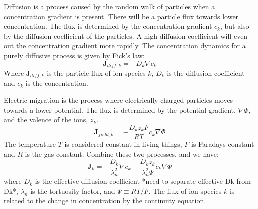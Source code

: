 \documentclass{article}
\begin{document}
Diffusion is a process caused by the random walk of particles when a concentration gradient is present. There will be a particle flux towards lower concentration. The flux is determined by the concentration gradient $c_k$, but also by the diffusion coefficient of the particles. A high diffusion coefficient will even out the concentration gradient more rapidly. The concentration dynamics for a purely diffusive process is given by Fick's law:
\begin{equation}\label{eq:diff}
 \bm{J}_{diff,k} = - D_k\nabla c_k
\end{equation}
Where  $\bm{J}_{diff,k}$ is the particle flux of ion species $k$, $D_k$ is the diffusion coefficient and $c_k$ is the concentration.

Electric migration is the process where electrically charged particles moves towards a lower potential. The flux is determined by the potential gradient, $\nabla \Phi$,  and the valence of the ions, $z_k$. 
\begin{equation}\label{eq:field}
\bm{J}_{field,k} = -\frac{D_kz_kF}{RT} c_k\nabla \Phi
\end{equation}
The temperature $T$ is considered constant in living things, $F$ is Faradays constant and $R$ is the gas constant. Combine these two processes, and we have:
 \begin{equation}\label{eq:eldiff fulx}
\bm{J}_k = -\frac{D_k}{\lambda_n^2}\nabla c_k -\frac{D_k z_k}{\lambda_n^2 \Psi}c_k  \nabla \Phi
\end{equation}
where $D_k$ is the effective diffusion coefficient *need to separate effective Dk from Dk*, $\lambda_n$ is the tortuosity factor, and $\Psi \equiv RT/F$.
The flux  of ion species $k$ is related to the change in concentration by the continuity equation. 
\end{document}
